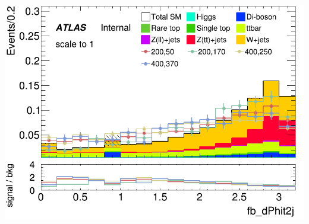 \documentclass[usenames,dvipsnames]{beamer}
\begin{document}
\begin{frame}
\begin{minipage}{0.32\textwidth}
        \includegraphics[width=\textwidth]{graphics/LH_met_sig/LH_fb_dPhit2j_norm.png}
    \end{minipage}
    
    \vspace{0.5cm} %


\end{frame}
\end{document}
